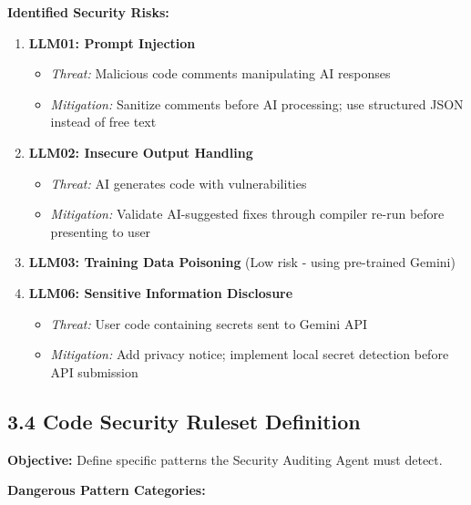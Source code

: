 \documentclass[a4paper,11pt]{article}
\begin{document}
\textbf{Identified Security Risks:}

\begin{enumerate}
    \item \textbf{LLM01: Prompt Injection}
    \begin{itemize}
        \item \textit{Threat:} Malicious code comments manipulating AI responses
        \item \textit{Mitigation:} Sanitize comments before AI processing; use structured JSON instead of free text
    \end{itemize}
    
    \item \textbf{LLM02: Insecure Output Handling}
    \begin{itemize}
        \item \textit{Threat:} AI generates code with vulnerabilities
        \item \textit{Mitigation:} Validate AI-suggested fixes through compiler re-run before presenting to user
    \end{itemize}
    
    \item \textbf{LLM03: Training Data Poisoning} (Low risk - using pre-trained Gemini)
    
    \item \textbf{LLM06: Sensitive Information Disclosure}
    \begin{itemize}
        \item \textit{Threat:} User code containing secrets sent to Gemini API
        \item \textit{Mitigation:} Add privacy notice; implement local secret detection before API submission
    \end{itemize} %
\end{enumerate}

\subsection{3.4 Code Security Ruleset Definition}

\textbf{Objective:} Define specific patterns the Security Auditing Agent must detect.

\textbf{Dangerous Pattern Categories:}
\end{document}
